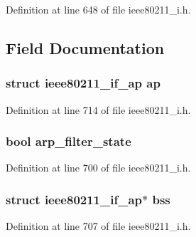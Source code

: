 Definition at line 648 of file ieee80211\-\_\-i.\-h.



\subsection{Field Documentation}
\hypertarget{structieee80211__sub__if__data_aa7802c0ad2f6a05610aea467f294ebd2}{
\subsubsection[{ap}]{\setlength{\rightskip}{0pt plus 5cm}struct {\bf ieee80211\-\_\-if\-\_\-ap} ap}}\label{structieee80211__sub__if__data_aa7802c0ad2f6a05610aea467f294ebd2}


Definition at line 714 of file ieee80211\-\_\-i.\-h.

\hypertarget{structieee80211__sub__if__data_a0216068b0f336a8922737d055a92e4cd}{
\subsubsection[{arp\-\_\-filter\-\_\-state}]{\setlength{\rightskip}{0pt plus 5cm}bool arp\-\_\-filter\-\_\-state}}\label{structieee80211__sub__if__data_a0216068b0f336a8922737d055a92e4cd}


Definition at line 700 of file ieee80211\-\_\-i.\-h.

\hypertarget{structieee80211__sub__if__data_a45b3472e16d1f1a8c58e64b338d4e946}{
\subsubsection[{bss}]{\setlength{\rightskip}{0pt plus 5cm}struct {\bf ieee80211\-\_\-if\-\_\-ap}$\ast$ bss}}\label{structieee80211__sub__if__data_a45b3472e16d1f1a8c58e64b338d4e946}


Definition at line 707 of file ieee80211\-\_\-i.\-h.

